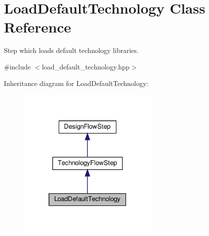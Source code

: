 \hypertarget{classLoadDefaultTechnology}{}\section{Load\+Default\+Technology Class Reference}
\label{classLoadDefaultTechnology}


Step which loads default technology libraries.  




{\ttfamily \#include $<$load\+\_\+default\+\_\+technology.\+hpp$>$}



Inheritance diagram for Load\+Default\+Technology\+:
\nopagebreak
\begin{figure}[H]
\begin{center}
\leavevmode
\includegraphics[width=199pt]{d9/dab/classLoadDefaultTechnology__inherit__graph}
\end{center}
\end{figure}


